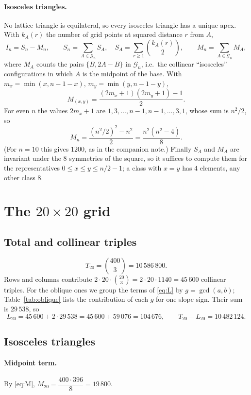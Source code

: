 \documentclass[11pt,a4paper]{article}
\theoremstyle{remark}
\newcommand{\G}{\mathcal{G}}
\begin{document}
\paragraph{Isosceles triangles.} No lattice triangle is equilateral, so every
isosceles triangle has a unique apex. With $k_A(r)$ the number of grid points at
squared distance $r$ from $A$,
\begin{equation}\label{eq:I}
  I_n=S_n-M_n,\qquad
  S_n=\sum_{A\in\G_n}S_A,\quad S_A=\sum_{r\ge1}\binom{k_A(r)}{2},\qquad
  M_n=\sum_{A\in\G_n}M_A,
\end{equation}
where $M_A$ counts the pairs $\{B,2A-B\}$ in $\G_n$, i.e.\ the collinear
``isosceles'' configurations in which $A$ is the midpoint of the base. With
$m_x=\min(x,n-1-x)$, $m_y=\min(y,n-1-y)$,
\[
  M_{(x,y)}=\frac{(2m_x+1)(2m_y+1)-1}{2}.
\]
For even $n$ the values $2m_x+1$ are $1,3,\dots,n-1,n-1,\dots,3,1$, whose sum is
$n^2/2$, so
\begin{equation}\label{eq:M}
  M_n=\frac{(n^2/2)^2-n^2}{2}=\frac{n^2(n^2-4)}{8}.
\end{equation}
(For $n=10$ this gives $1200$, as in the companion note.) Finally $S_A$ and $M_A$
are invariant under the $8$ symmetries of the square, so it suffices to compute
them for the representatives $0\le x\le y\le n/2-1$; a class with $x=y$ has $4$
elements, any other class $8$.

\section{The $20\times20$ grid}

\subsection{Total and collinear triples}
\[
  T_{20}=\binom{400}{3}=10\,586\,800.
\]
Rows and columns contribute $2\cdot20\cdot\binom{20}{3}=2\cdot20\cdot1140=45\,600$
collinear triples. For the oblique ones we group the terms of \eqref{eq:L} by
$g=\gcd(a,b)$; Table~\ref{tab:oblique} lists the contribution of each $g$ for one
slope sign. Their sum is $29\,538$, so
\[
  L_{20}=45\,600+2\cdot29\,538=45\,600+59\,076=104\,676,
  \qquad
  T_{20}-L_{20}=10\,482\,124 .
\]

\subsection{Isosceles triangles}

\paragraph{Midpoint term.} By \eqref{eq:M},
$M_{20}=\dfrac{400\cdot396}{8}=19\,800$.
\end{document}
